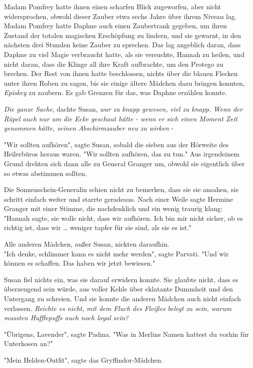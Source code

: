 {Madam Pomfrey hatte ihnen einen scharfen Blick zugeworfen, aber nicht widersprochen, obwohl dieser Zauber etwa sechs Jahre über ihrem Niveau lag. Madam Pomfrey hatte Daphne auch einen Zaubertrank gegeben, um ihren Zustand der totalen magischen Erschöpfung zu lindern, und sie gewarnt, in den nächsten drei Stunden keine Zauber zu sprechen. Das lag angeblich daran, dass Daphne zu viel Magie verbraucht hatte, als sie versuchte, Hannah zu heilen, und nicht daran, dass die Klinge all ihre Kraft aufbrachte, um den Protego zu brechen. Der Rest von ihnen hatte beschlossen, nichts über die blauen Flecken unter ihren Roben zu sagen, bis sie einige ältere Mädchen dazu bringen konnten, \emph{Episkey} zu zaubern. Es gab Grenzen für das, was Daphne erzählen konnte.

\emph{Die ganze Sache}, dachte Susan, \emph{war zu knapp gewesen, viel zu knapp. Wenn der Rüpel auch nur um die Ecke geschaut hätte - wenn er sich einen Moment Zeit genommen hätte, seinen Abschirmzauber neu zu wirken} -

"Wir sollten aufhören", sagte Susan, sobald die sieben aus der Hörweite des Heilerbüros heraus waren. "Wir sollten aufhören, das zu tun." Aus irgendeinem Grund drehten sich dann alle zu General Granger um, obwohl sie eigentlich über so etwas abstimmen sollten.

Die Sonnenschein-Generalin schien nicht zu bemerken, dass sie sie ansahen, sie schritt einfach weiter und starrte geradeaus. Nach einer Weile sagte Hermine Granger mit einer Stimme, die nachdenklich und ein wenig traurig klang: "Hannah sagte, sie wolle nicht, dass wir aufhören. Ich bin mir nicht sicher, ob es richtig ist, dass wir … weniger tapfer für sie sind, als sie es ist."

Alle anderen Mädchen, außer Susan, nickten daraufhin.\\ "Ich denke, schlimmer kann es nicht mehr werden", sagte Parvati. "Und wir können es schaffen. Das haben wir jetzt bewiesen."

Susan fiel nichts ein, was sie darauf erwidern konnte. Sie glaubte nicht, dass es überzeugend sein würde, aus voller Kehle über eklatante Dummheit und den Untergang zu schreien. Und sie konnte die anderen Mädchen auch nicht einfach verlassen. \emph{Reichte es nicht, mit dem Fluch des Fleißes belegt zu sein, warum mussten Hufflepuffs auch noch loyal sein?}

"Übrigens, Lavender", sagte Padma. "Was in Merlins Namen hattest du vorhin für Unterhosen an?"

"Mein Helden-Outfit", sagte das Gryffindor-Mädchen.

}

